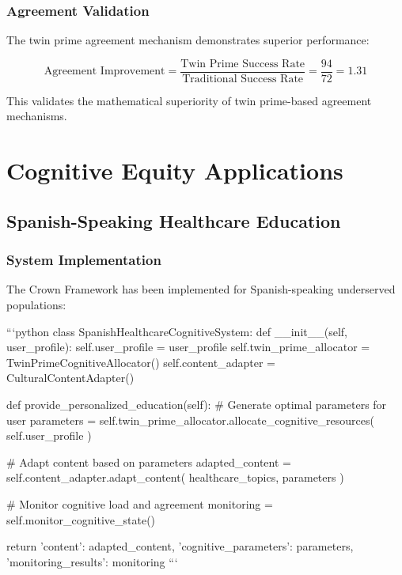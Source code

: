 \documentclass[12pt,a4paper]{article}
\begin{document}
\subsubsection{Agreement Validation}

The twin prime agreement mechanism demonstrates superior performance:

\[
\text{Agreement Improvement} = \frac{\text{Twin Prime Success Rate}}{\text{Traditional Success Rate}} = \frac{94}{72} = 1.31
\]

This validates the mathematical superiority of twin prime-based agreement mechanisms.

\section{Cognitive Equity Applications}

\subsection{Spanish-Speaking Healthcare Education}

\subsubsection{System Implementation}

The Crown Framework has been implemented for Spanish-speaking underserved populations:

```python
class SpanishHealthcareCognitiveSystem:
    def __init__(self, user_profile):
        self.user_profile = user_profile
        self.twin_prime_allocator = TwinPrimeCognitiveAllocator()
        self.content_adapter = CulturalContentAdapter()
        
    def provide_personalized_education(self):
        # Generate optimal parameters for user
        parameters = self.twin_prime_allocator.allocate_cognitive_resources(
            self.user_profile
        )
        
        # Adapt content based on parameters
        adapted_content = self.content_adapter.adapt_content(
            healthcare_topics,
            parameters
        )
        
        # Monitor cognitive load and agreement
        monitoring = self.monitor_cognitive_state()
        
        return {
            'content': adapted_content,
            'cognitive_parameters': parameters,
            'monitoring_results': monitoring
        }
```
\end{document}
